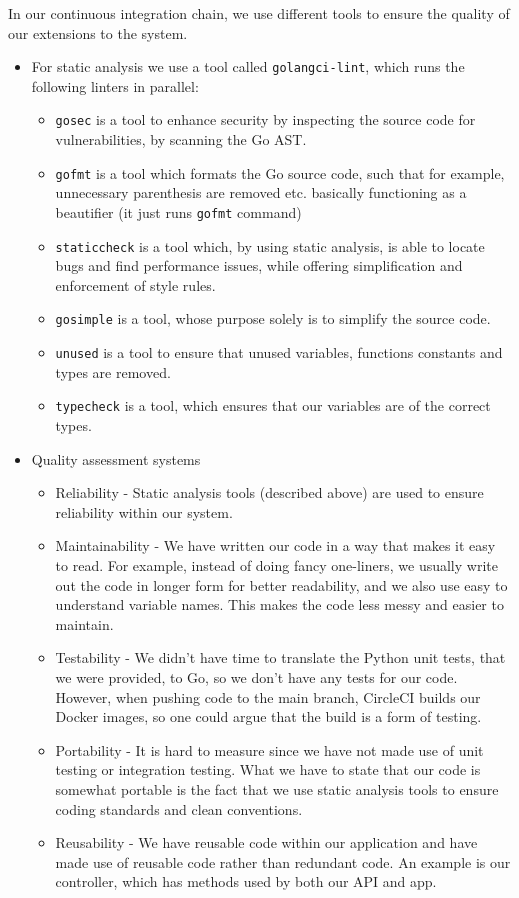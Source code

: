 In our continuous integration chain, we use different tools to ensure the quality of our extensions to the system.
\begin{itemize}
    \item For static analysis we use a tool called \texttt{golangci-lint}, which runs the following linters in parallel:
    \begin{itemize}
        \item \texttt{gosec} is a tool to enhance security by inspecting the source code for vulnerabilities, by scanning the Go AST.
        \item \texttt{gofmt} is a tool which formats the Go source code, such that for example, unnecessary parenthesis are removed etc. basically functioning as a beautifier (it just runs \texttt{gofmt} command)
        \item \texttt{staticcheck} is a tool which, by using static analysis, is able to locate bugs and find performance issues, while offering simplification and enforcement of style rules.
        \item \texttt{gosimple} is a tool, whose purpose solely is to simplify the source code.
        \item \texttt{unused} is a tool to ensure that unused variables, functions constants and types are removed.
        \item \texttt{typecheck} is a tool, which ensures that our variables are of the correct types.
    \end{itemize}
    \item Quality assessment systems
    \begin{itemize}
        \item Reliability - Static analysis tools (described above) are used to ensure reliability within our system.
        \item Maintainability - We have written our code in a way that makes it easy to read. For example, instead of doing fancy one-liners, we usually write out the code in longer form for better readability, and we also use easy to understand variable names. This makes the code less messy and easier to maintain.
        \item Testability - We didn't have time to translate the Python unit tests, that we were provided, to Go, so we don't have any tests for our code. However, when pushing code to the main branch, CircleCI builds our Docker images, so one could argue that the build is a form of testing.
        \item Portability - It is hard to measure since we have not made use of unit testing or integration testing. What we have to state that our code is somewhat portable is the fact that we use static analysis tools to ensure coding standards and clean conventions.
        \item Reusability - We have reusable code within our application and have made use of reusable code rather than redundant code. An example is our controller, which has methods used by both our API and app.
        

\end{itemize}
\end{itemize}
